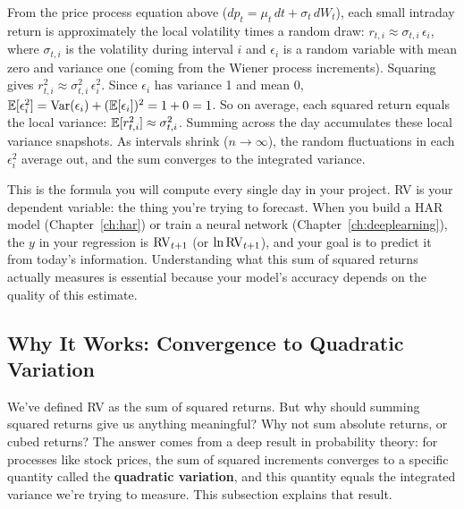\begin{intuition}
From the price process equation above ($dp_t = \mu_t\,dt + \sigma_t\,dW_t$), each small intraday return is approximately the local volatility times a random draw: $r_{t,i} \approx \sigma_{t,i}\,\epsilon_i$, where $\sigma_{t,i}$ is the volatility during interval $i$ and $\epsilon_i$ is a random variable with mean zero and variance one (coming from the Wiener process increments).
Squaring gives $r^2_{t,i} \approx \sigma^2_{t,i}\,\epsilon^2_i$.
Since $\epsilon_i$ has variance 1 and mean 0, $\mathbb{E}[\epsilon^2_i] = \operatorname{Var}(\epsilon_i) + (\mathbb{E}[\epsilon_i])^2 = 1 + 0 = 1$.
So on average, each squared return equals the local variance: $\mathbb{E}[r^2_{t,i}] \approx \sigma^2_{t,i}$.
Summing across the day accumulates these local variance snapshots.
As intervals shrink ($n \to \infty$), the random fluctuations in each $\epsilon^2_i$ average out, and the sum converges to the integrated variance.
\end{intuition}

\begin{projectconnection}
This is the formula you will compute every single day in your project.
RV is your dependent variable: the thing you're trying to forecast.
When you build a HAR model (Chapter~\ref{ch:har}) or train a neural network (Chapter~\ref{ch:deeplearning}), the $y$ in your regression is $\operatorname{RV}_{t+1}$ (or $\ln \operatorname{RV}_{t+1}$), and your goal is to predict it from today's information.
Understanding what this sum of squared returns actually measures is essential because your model's accuracy depends on the quality of this estimate.
\end{projectconnection}

\subsection{Why It Works: Convergence to Quadratic Variation}

We've defined RV as the sum of squared returns.
But why should summing squared returns give us anything meaningful?
Why not sum absolute returns, or cubed returns?
The answer comes from a deep result in probability theory: for processes like stock prices, the sum of squared increments converges to a specific quantity called the \textbf{quadratic variation}, and this quantity equals the integrated variance we're trying to measure.
This subsection explains that result.

